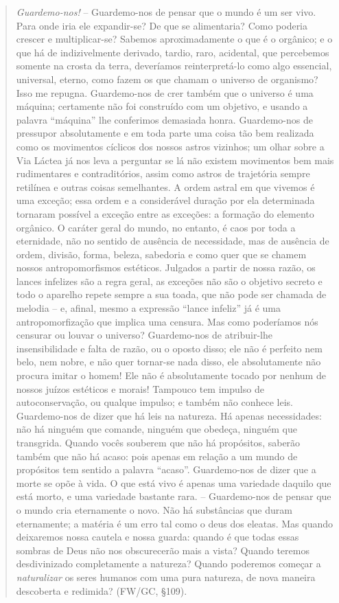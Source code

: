 \documentclass[
	12pt,				%
	openright,			%
	oneside,			%
	a4paper,			%
	english,			%
	french,				%
	spanish,			%
	brazil				%
	]{abntex2}
\begin{document}
\begin{quotation}
\textit{Guardemo-nos!} – Guardemo-nos de pensar que o mundo é um ser vivo. Para onde iria ele expandir-se? De que se alimentaria? Como poderia crescer e multiplicar-se? Sabemos aproximadamente o que é o orgânico; e o que há de indizivelmente derivado, tardio, raro, acidental, que percebemos somente na crosta da terra, deveríamos reinterpretá-lo como algo essencial, universal, eterno, como fazem os que chamam o universo de organismo? Isso me repugna. Guardemo-nos de crer também que o universo é uma máquina; certamente não foi construído com um objetivo, e usando a palavra “máquina” lhe conferimos demasiada honra. Guardemo-nos de pressupor absolutamente e em toda parte uma coisa tão bem realizada como os movimentos cíclicos dos nossos astros vizinhos; um olhar sobre a Via Láctea já nos leva a perguntar se lá não existem movimentos bem mais rudimentares e contraditórios, assim como astros de trajetória sempre retilínea e outras coisas semelhantes. A ordem astral em que vivemos é uma exceção; essa ordem e a considerável duração por ela determinada tornaram possível a exceção entre as exceções: a formação do elemento orgânico. O caráter geral do mundo, no entanto, é caos por toda a eternidade, não no sentido de ausência de necessidade, mas de ausência de ordem, divisão, forma, beleza, sabedoria e como quer que se chamem nossos antropomorfismos estéticos. Julgados a partir de nossa razão, os lances infelizes são a regra geral, as exceções não são o objetivo secreto e todo o aparelho repete sempre a sua toada, que não pode ser chamada de melodia – e, afinal, mesmo a expressão “lance infeliz” já é uma antropomorfização que implica uma censura. Mas como poderíamos nós censurar ou louvar o universo? Guardemo-nos de atribuir-lhe insensibilidade e falta de razão, ou o oposto disso; ele não é perfeito nem belo, nem nobre, e não quer tornar-se nada disso, ele absolutamente não procura imitar o homem! Ele não é absolutamente tocado por nenhum de nossos juízos estéticos e morais! Tampouco tem impulso de autoconservação, ou qualque impulso; e também não conhece leis. Guardemo-nos de dizer que há leis na natureza. Há apenas necessidades: não há ninguém que comande, ninguém que obedeça, ninguém que transgrida. Quando vocês souberem que não há propósitos, saberão também que não há acaso: pois apenas em relação a um mundo de propósitos tem sentido a palavra “acaso”. Guardemo-nos de dizer que a morte se opõe à vida. O que está vivo é apenas uma variedade daquilo que está morto, e uma variedade bastante rara. – Guardemo-nos de pensar que o mundo cria eternamente o novo. Não há substâncias que duram eternamente; a matéria é um erro tal como o deus dos eleatas. Mas quando deixaremos nossa cautela e nossa guarda: quando é que todas essas sombras de Deus não nos obscurecerão mais a vista? Quando teremos desdivinizado completamente a natureza? Quando poderemos começar a \textit{naturalizar} os seres humanos com uma pura natureza, de nova maneira descoberta e redimida? (FW/GC, §109).
\end{quotation}
\end{document}
